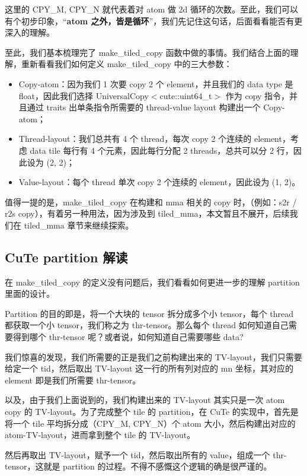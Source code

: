 这里的  CPY\_M, CPY\_N 就代表着对 atom 做 2d 循环的次数。至此，我们可以有个初步印象，“\textbf{atom 之外，皆是循环}”，我们先记住这句话，后面看看能否有更深入的理解。

至此，我们基本梳理完了 make\_tiled\_copy 函数中做的事情。我们结合上面的理解，重新看看我们如何定义 make\_tiled\_copy 中的三大参数：

\begin{itemize}
  \item Copy-atom：因为我们 1 次要 copy 2 个 element，并且我们的 data type 是 float，因此我们选择 UniversalCopy$<$cute::uint64\_t$>$ 作为 copy 指令，并且通过 traits 出单条指令所需要的 thread-value layout 构建出一个 Copy-atom；
  \item Thread-layout：我们总共有 4 个 thread，每次 copy 2 个连续的 element，考虑 data tile 每行有 4 个元素，因此每行分配 2 threads，总共可以分 2 行，因此设为 (2, 2)；
  \item Value-layout：每个 thread 单次 copy 2 个连续的 element，因此设为 (1, 2)。
\end{itemize}

值得一提的是，make\_tiled\_copy 在构建和 mma 相关的 copy 时，（例如：s2r / r2s copy），有着另一种用法，因为涉及到 tiled\_mma，本文暂且不展开，后续我们在 tiled\_mma 章节来继续探索。

\subsection{CuTe partition 解读}

在 make\_tiled\_copy 的定义没有问题后，我们看看如何更进一步的理解 partition 里面的设计。

Partition 的目的即是，将一个大块的 tensor 拆分成多个小 tensor，每个 thread 都获取一个小 tensor，我们称之为 thr-tensor。那么每个 thread 如何知道自己需要得到哪个 thr-tensor 呢？或者说，如何知道自己需要哪些 data?

我们惊喜的发现，我们所需要的正是我们之前构建出来的 TV-layout，我们只需要给定一个 tid，然后取出 TV-layout 这一行的所有列对应的 mn 坐标，其对应的 element 即是我们所需要 thr-tensor。

以及，由于我们上面说到的，我们构建出来的 TV-layout 其实只是一次 atom copy 的 TV-layout。为了完成整个 tile 的 partition，在 CuTe 的实现中，首先是将一个 tile 平均拆分成（CPY\_M, CPY\_N）个 atom 大小，然后构建出对应的 atom-TV-layout，进而拿到整个 tile 的 TV-layout。

然后再取出 TV-layout，赋予一个 tid，然后取出所有的 value，组成一个  thr-tensor，这就是 partition 的过程。不得不感慨这个逻辑的确是很严谨的。

